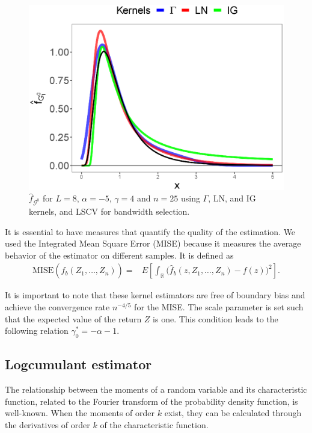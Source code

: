 \documentclass[twocolumn]{svjour3}
\begin{document}
	\begin{figure}[hbt]
		\centering
		\includegraphics[width=\linewidth]{NucleosGALNyIG.eps}
		\caption{$\widehat{f}_{\mathcal{G}^0}$ for $L=8$, $\alpha=-5$, $\gamma=4$ and $n=25$ using $\Gamma$, LN, and IG kernels, and LSCV for bandwidth selection.}\label{EstimacionLNyGAyIG}
	\end{figure}
	
	It is essential to have measures that quantify the quality of the estimation. 
	We used the Integrated Mean Square Error (MISE) because it measures the average behavior of the estimator on different samples. 
	It is defined as
	\begin{align}
		\label{Mise}
		\text{MISE}(\widehat{f}_b(Z_1,\ldots,Z_n))=&E\left[\int_\mathbb{R} \big(\widehat{f}_b(z,Z_1,\ldots,Z_n)-f(z)\big)^2 \right].
	\end{align}
	
	It is important to note that these kernel estimators are free of boundary bias and achieve the convergence rate $n^{-4/5}$ for the MISE.
	The scale parameter is set such that the expected value of the return $Z$ is one. 
	This condition leads to the following relation $\gamma_0^*=-\alpha-1$.
	
	\subsection{Logcumulant estimator}\label{lc}
	
	The relationship between the moments of a random variable and its characteristic function, related to the Fourier transform of the probability density function, is well-known. 
	When the moments of order $k$ exist, they can be calculated through the derivatives of order $k$ of the characteristic function.
	
\end{document}
